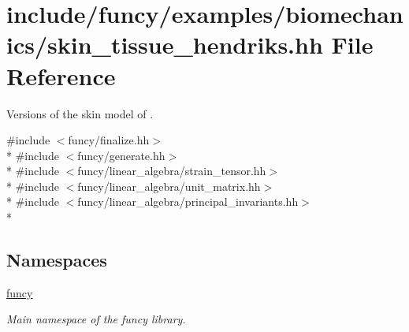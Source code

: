 \hypertarget{skin__tissue__hendriks_8hh}{\section{include/funcy/examples/biomechanics/skin\-\_\-tissue\-\_\-hendriks.hh File Reference}
\label{skin__tissue__hendriks_8hh}
}


Versions of the skin model of \cite{Hendriks2005}.  


{\ttfamily \#include $<$funcy/finalize.\-hh$>$}\\*
{\ttfamily \#include $<$funcy/generate.\-hh$>$}\\*
{\ttfamily \#include $<$funcy/linear\-\_\-algebra/strain\-\_\-tensor.\-hh$>$}\\*
{\ttfamily \#include $<$funcy/linear\-\_\-algebra/unit\-\_\-matrix.\-hh$>$}\\*
{\ttfamily \#include $<$funcy/linear\-\_\-algebra/principal\-\_\-invariants.\-hh$>$}\\*
\subsection*{Namespaces}
\begin{DoxyCompactItemize}
\item 
\hyperlink{namespacefuncy}{funcy}
\begin{DoxyCompactList}\small\item\em Main namespace of the funcy library. \end{DoxyCompactList}\end{DoxyCompactItemize}
